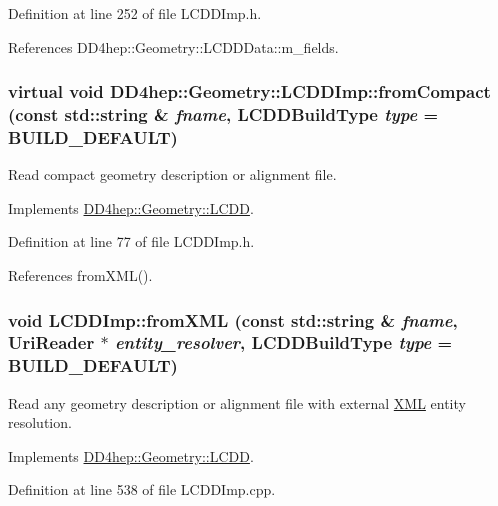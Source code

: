 Definition at line 252 of file LCDDImp.h.

References DD4hep::Geometry::LCDDData::m\_\-fields.\hypertarget{class_d_d4hep_1_1_geometry_1_1_l_c_d_d_imp_a4eb2edfae225abead99a6cd6a85e84f7}{
\subsubsection[{fromCompact}]{\setlength{\rightskip}{0pt plus 5cm}virtual void DD4hep::Geometry::LCDDImp::fromCompact (const std::string \& {\em fname}, \/  {\bf LCDDBuildType} {\em type} = {\ttfamily BUILD\_\-DEFAULT})}}
\label{class_d_d4hep_1_1_geometry_1_1_l_c_d_d_imp_a4eb2edfae225abead99a6cd6a85e84f7}


Read compact geometry description or alignment file. 

Implements \hyperlink{class_d_d4hep_1_1_geometry_1_1_l_c_d_d_abc18ac1b03188da6e4400943eca4bd2e}{DD4hep::Geometry::LCDD}.

Definition at line 77 of file LCDDImp.h.

References fromXML().\hypertarget{class_d_d4hep_1_1_geometry_1_1_l_c_d_d_imp_ae1c435032cd33235cd6405ca8d8aae9b}{
\subsubsection[{fromXML}]{\setlength{\rightskip}{0pt plus 5cm}void LCDDImp::fromXML (const std::string \& {\em fname}, \/  {\bf UriReader} $\ast$ {\em entity\_\-resolver}, \/  {\bf LCDDBuildType} {\em type} = {\ttfamily BUILD\_\-DEFAULT})}}
\label{class_d_d4hep_1_1_geometry_1_1_l_c_d_d_imp_ae1c435032cd33235cd6405ca8d8aae9b}


Read any geometry description or alignment file with external \hyperlink{namespace_d_d4hep_1_1_x_m_l}{XML} entity resolution. 

Implements \hyperlink{class_d_d4hep_1_1_geometry_1_1_l_c_d_d_aab90efbd334c08ee8a06b0f97d219243}{DD4hep::Geometry::LCDD}.

Definition at line 538 of file LCDDImp.cpp.

